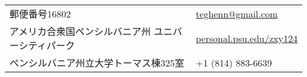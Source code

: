 \documentclass[utf8,letterpaper,oneside]{article}
\begin{document}
\small
\setmainfont[BoldFont=ipaexg.ttf]{ipaexm.ttf}

\begin{center}
 \begin{tabular}{l l}
  郵便番号16802                                        & \hspace{1in} \href{mailto:teghenn@gmail.com}{teghenn@gmail.com}                \\
  アメリカ合衆国ペンシルバニア州  ユニバーシティパーク & \hspace{1in}   \href{http://personal.psu.edu/zxy124/}{personal.psu.edu/zxy124} \\
  ペンシルバニア州立大学トーマス棟325室                & \hspace{1in}+1 (814) 883-6639                                                  \\
 \end{tabular}
\end{center}
\noindent
\end{document}
